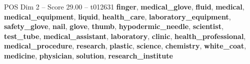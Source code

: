 \begin{textsample}{POS Dim 2 – Score 29.00 – t012631}  \label{ex:f2_pos_013}
\textbf{finger}, \textbf{medical\_glove}, \textbf{fluid}, \textbf{medical}, \textbf{medical\_equipment}, \textbf{liquid}, \textbf{health\_care}, \textbf{laboratory\_equipment}, \textbf{safety\_glove}, \textbf{nail}, \textbf{glove}, \textbf{thumb}, \textbf{hypodermic\_needle}, \textbf{scientist}, \textbf{test\_tube}, \textbf{medical\_assistant}, \textbf{laboratory}, \textbf{clinic}, \textbf{health\_professional}, \textbf{medical\_procedure}, \textbf{research}, \textbf{plastic}, \textbf{science}, \textbf{chemistry}, \textbf{white\_coat}, \textbf{medicine}, \textbf{physician}, \textbf{solution}, \textbf{research\_institute}

\end{textsample}
